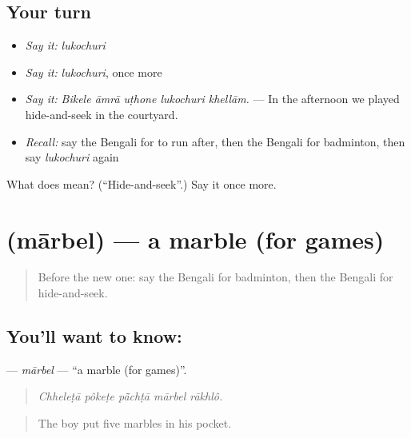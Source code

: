 \subsection*{Your turn}
\begin{itemize}
\raggedright
  \item \emph{Say it:} \emph{lukochuri}
  \item \emph{Say it:} \emph{lukochuri}, once more
  \item \emph{Say it:} \emph{Bikele āmrā uṭhone lukochuri khellām.} — In the afternoon we played hide-and-seek in the courtyard.
  \item \emph{Recall:} say the Bengali for to run after, then the Bengali for badminton, then say \emph{lukochuri} again
\end{itemize}

\begin{tcolorbox}[breakable,colback=teal!4,colframe=teal!35!black,title={Before you move on}]
What does  mean? (\textquotedblleft{}Hide-and-seek\textquotedblright{}.) Say it once more.
\end{tcolorbox}
\section[\texorpdfstring{\bn{মার্বেল} (mārbel)}{মার্বেল (mārbel)}]{ (mārbel) — a marble (for games)}

\label{lesson:BN-C517-marbel}



\begin{quote}
Before the new one: say the Bengali for badminton, then the Bengali for hide-and-seek.
\end{quote}

\subsection*{You'll want to know: }
\textbf{} — \emph{mārbel} — \textquotedblleft{}a marble (for games)\textquotedblright{}.

\begin{quote}
    
\end{quote}

\begin{quote}
\emph{Chheleṭā pôkeṭe pā̃chṭā mārbel rākhlô.}
\end{quote}

\begin{quote}
The boy put five marbles in his pocket.
\end{quote}

